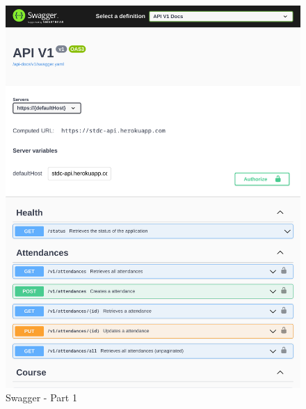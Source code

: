 \begin{justify}
        \begin{figure}[H]
            \begin{minipage}[trim]{1\textwidth}
            \centerline{\includegraphics[width=150mm,scale=1]{figures/implementation_and_testing/implementation/backend/swagger-1.pdf}}
            \caption{Swagger - Part 1}
            \end{minipage}
        \end{figure}


\end{justify}
